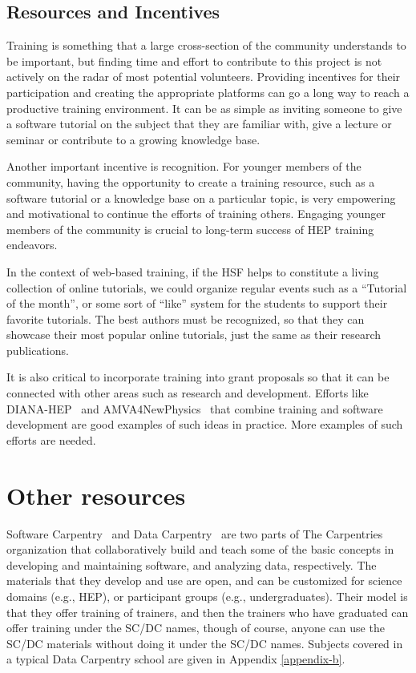 \documentclass[12pt,a4paper]{article}
\begin{document}
\subsection{Resources and Incentives}

Training is something that a large cross-section of the community
understands to be important, but finding time and effort to contribute to this
project is not actively on the radar of most potential volunteers. Providing
incentives for their participation and creating the appropriate platforms can go
a long way to reach a productive training environment. It can be as simple as
inviting someone to give a software tutorial on the subject that they are
familiar with, give a lecture or seminar or contribute to a growing knowledge
base.

Another important incentive is recognition. For younger members of the
community, having the opportunity to create a training resource, such as a
software tutorial or a knowledge base on a particular topic, is very empowering
and motivational to continue the efforts of training others. Engaging younger
members of the community is crucial to long-term success of HEP training
endeavors.

In the context of web-based training, if the HSF helps to constitute a living
collection of online tutorials, we could organize regular events such as
a ``Tutorial of the month'', or some sort of ``like'' system for the students
to support their favorite tutorials. The best authors must be recognized, so
that they can showcase their most popular online tutorials, just the same as
their research publications.

It is also critical to incorporate training into grant proposals so that it can
be connected with other areas such as research and development. Efforts like
DIANA-HEP~\cite{DIANA-HEP} and AMVA4NewPhysics~\cite{AMVA4NewPhysics}
that combine training
and software development are good examples of such ideas in practice. More
examples of such efforts are needed.


\section{Other resources}

Software Carpentry~\cite{SoftwareCarpentry} and Data
Carpentry~\cite{DataCarpentry} are two parts of The
Carpentries organization that collaboratively build and teach some of the basic
concepts in developing and maintaining software, and analyzing data,
respectively.  The materials that they develop and use are open, and can be
customized for science domains (e.g., HEP), or participant groups (e.g.,
undergraduates). Their model is that they offer training of trainers, and then
the trainers who have graduated can offer training under the SC/DC names, though
of course, anyone can use the SC/DC materials without doing it under the SC/DC
names.
Subjects covered in a typical Data Carpentry school are given in Appendix
\ref{appendix-b}.
\end{document}
